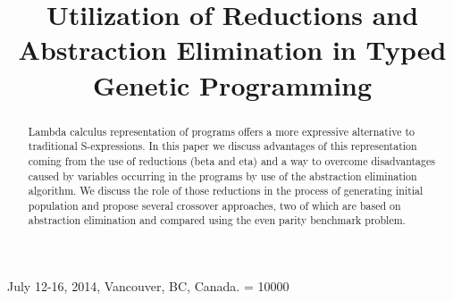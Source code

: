 \documentclass{sig-alternate}
\begin{document}
 {July 12-16, 2014, Vancouver, BC, Canada.}
\widowpenalty = 10000

\title{Utilization of Reductions and Abstraction Elimination in Typed Genetic Programming}


%


\maketitle
\begin{abstract}
Lambda calculus representation of programs offers a more expressive alternative to traditional S-expressions. In this paper we discuss advantages of this representation coming from the use of reductions (beta and eta) and a way to overcome disadvantages caused by variables occurring in the programs by use of the abstraction elimination algorithm. We discuss the role of those reductions in the process of generating initial population and propose several crossover approaches, two of which are based on abstraction elimination and compared using the even parity benchmark problem. 
\end{abstract}
\end{document}
